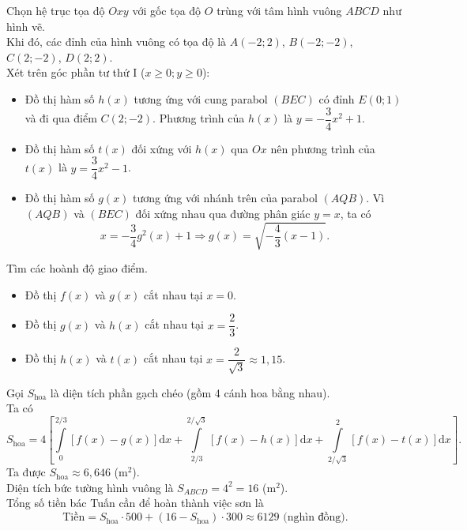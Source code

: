 \begin{ex}
{\begin{center}
\begin{tikzpicture}
			\end{tikzpicture}
		\end{center}
		Chọn hệ trục tọa độ $Oxy$ với gốc tọa độ $O$ trùng với tâm hình vuông $ABCD$ như hình vẽ.\\
		Khi đó, các đỉnh của hình vuông có tọa độ là $A(-2; 2)$, $B(-2; -2)$, $C(2; -2)$, $D(2; 2)$.\\
		Xét trên góc phần tư thứ I ($x \ge 0; y \ge 0$):
		\begin{itemize}
			\item Đồ thị hàm số $h(x)$ tương ứng với cung parabol $(BEC)$ có đỉnh $E(0; 1)$ và đi qua điểm $C(2; -2)$. Phương trình của $h(x)$ là $y = -\dfrac{3}{4}x^2 + 1$.
			\item Đồ thị hàm số $t(x)$ đối xứng với $h(x)$ qua $Ox$ nên phương trình của $t(x)$ là $y = \dfrac{3}{4}x^2 - 1$.
			\item Đồ thị hàm số $g(x)$ tương ứng với nhánh trên của parabol $(AQB)$. Vì $(AQB)$ và $(BEC)$ đối xứng nhau qua đường phân giác $y = x$, ta có
			$$x = -\dfrac{3}{4}g^2(x) + 1 \Rightarrow g(x) = \sqrt{-\dfrac{4}{3}(x-1)}.$$
		\end{itemize}
		Tìm các hoành độ giao điểm.
		\begin{itemize}
		\item Đồ thị $f(x)$ và $g(x)$ cắt nhau tại $x = 0$.	
		\item Đồ thị $g(x)$ và $h(x)$ cắt nhau tại $x = \dfrac{2}{3}$.
		\item Đồ thị $h(x)$ và $t(x)$ cắt nhau tại $x = \dfrac{2}{\sqrt{3}} \approx 1{,}15$.
		\end{itemize}
		Gọi $S_{\text{hoa}}$ là diện tích phần gạch chéo (gồm 4 cánh hoa bằng nhau). \\
		Ta có
		$$S_{\text{hoa}} = 4 \left[ \displaystyle\int\limits_{0}^{2/3} [f(x) - g(x)]\mathrm{d}x + \displaystyle\int\limits_{2/3}^{2/\sqrt{3}} [f(x) - h(x)]\mathrm{d}x + \displaystyle\int\limits_{2/\sqrt{3}}^{2} [f(x) - t(x)]\mathrm{d}x \right].$$
		Ta được $S_{\text{hoa}} \approx 6{,}646$ (m$^2$).\\
		Diện tích bức tường hình vuông là $S_{ABCD} = 4^2 = 16$ (m$^2$).\\
		Tổng số tiền bác Tuấn cần để hoàn thành việc sơn là
		$$\text{Tiền} = S_{\text{hoa}} \cdot 500 + (16 - S_{\text{hoa}}) \cdot 300 \approx 6129\text{ (nghìn đồng).}$$
	}
\end{ex}

